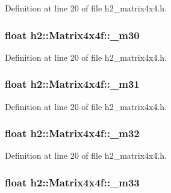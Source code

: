 Definition at line 20 of file h2\-\_\-matrix4x4.\-h.

\hypertarget{classh2_1_1_matrix4x4f_a84f503d2e971dc54a770a9a9a37912f4}{
\subsubsection[{\-\_\-m30}]{\setlength{\rightskip}{0pt plus 5cm}float h2\-::\-Matrix4x4f\-::\-\_\-m30}}\label{classh2_1_1_matrix4x4f_a84f503d2e971dc54a770a9a9a37912f4}


Definition at line 20 of file h2\-\_\-matrix4x4.\-h.

\hypertarget{classh2_1_1_matrix4x4f_acdb501108e0d0aeb93695c85010ceb56}{
\subsubsection[{\-\_\-m31}]{\setlength{\rightskip}{0pt plus 5cm}float h2\-::\-Matrix4x4f\-::\-\_\-m31}}\label{classh2_1_1_matrix4x4f_acdb501108e0d0aeb93695c85010ceb56}


Definition at line 20 of file h2\-\_\-matrix4x4.\-h.

\hypertarget{classh2_1_1_matrix4x4f_a17c9aa5e7f6a55024fec49eb29093bc4}{
\subsubsection[{\-\_\-m32}]{\setlength{\rightskip}{0pt plus 5cm}float h2\-::\-Matrix4x4f\-::\-\_\-m32}}\label{classh2_1_1_matrix4x4f_a17c9aa5e7f6a55024fec49eb29093bc4}


Definition at line 20 of file h2\-\_\-matrix4x4.\-h.

\hypertarget{classh2_1_1_matrix4x4f_a07e9a0772f8659cec76192eafcb2018c}{
\subsubsection[{\-\_\-m33}]{\setlength{\rightskip}{0pt plus 5cm}float h2\-::\-Matrix4x4f\-::\-\_\-m33}}\label{classh2_1_1_matrix4x4f_a07e9a0772f8659cec76192eafcb2018c}


